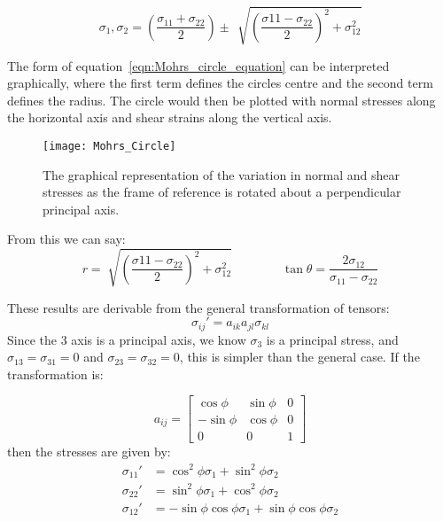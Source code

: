 \begin{equation}
\sigma_1, \sigma_2 = \left( \frac{\sigma_{11} + \sigma_{22}}{2} \right) \pm \,\sqrt[]{\left( \frac{\sigma{11}-\sigma_{22}}{2}\right)^2 + \sigma_{12}^2} \label{eqn:Mohrs_circle_equation}
\end{equation}

The form of equation~\ref{eqn:Mohrs_circle_equation} can be interpreted graphically, where the first term defines the circles centre and the second term defines the radius. The circle would then be plotted with normal stresses along the horizontal axis and shear strains along the vertical axis.

\begin{figure}[hb!]
\centering
\texttt{[image: Mohrs\_Circle]}
\caption{The graphical representation of the variation in normal and shear stresses as the frame of reference is rotated about a perpendicular principal axis.}
\end{figure}

\begin{annotation}
From this we can say:
\begin{equation}
r = \sqrt[]{\left( \frac{\sigma{11}-\sigma_{22}}{2}\right)^2 + \sigma_{12}^2} \qquad \qquad \tan \theta = \frac{2\sigma_{12}}{\sigma_{11} - \sigma_{22}}
\end{equation}
\end{annotation}

These results are derivable from the general transformation of tensors:
\begin{equation}
\sigma_{ij}' = a_{ik}a_{jl}\sigma_{kl}
\end{equation}
Since the 3 axis is a principal axis, we know $\sigma_{3}$ is a principal stress, and $\sigma_{13}=\sigma_{31}=0$ and $\sigma_{23}=\sigma_{32}=0$, this is simpler than the general case. If the transformation is:

\begin{equation}
a_{ij} = \left[ \begin{matrix}
\cos\phi & \sin\phi & 0 \\
-\sin\phi & \cos\phi & 0  \\
0 & 0 & 1
\end{matrix} \right]
\end{equation}
then the stresses are given by:
\begin{align}
\sigma_{11}' &= \cos^2\phi \sigma_1 + \sin^2\phi \sigma_2 \nonumber \\
\sigma_{22}' &= \sin^2\phi \sigma_1 + \cos^2\phi \sigma_2 \\
\sigma_{12}' &= - \sin\phi\cos\phi \sigma_1 + \sin \phi \cos \phi \sigma_2 \nonumber
\end{align}


